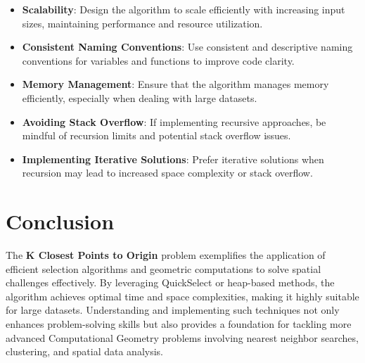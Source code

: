 \begin{itemize}
    \item \textbf{Scalability}: Design the algorithm to scale efficiently with increasing input sizes, maintaining performance and resource utilization.
    
    \item \textbf{Consistent Naming Conventions}: Use consistent and descriptive naming conventions for variables and functions to improve code clarity.
    
    \item \textbf{Memory Management}: Ensure that the algorithm manages memory efficiently, especially when dealing with large datasets.
    
    \item \textbf{Avoiding Stack Overflow}: If implementing recursive approaches, be mindful of recursion limits and potential stack overflow issues.
    
    \item \textbf{Implementing Iterative Solutions}: Prefer iterative solutions when recursion may lead to increased space complexity or stack overflow.
\end{itemize}

\section*{Conclusion}

The \textbf{K Closest Points to Origin} problem exemplifies the application of efficient selection algorithms and geometric computations to solve spatial challenges effectively. By leveraging QuickSelect or heap-based methods, the algorithm achieves optimal time and space complexities, making it highly suitable for large datasets. Understanding and implementing such techniques not only enhances problem-solving skills but also provides a foundation for tackling more advanced Computational Geometry problems involving nearest neighbor searches, clustering, and spatial data analysis.

\printindex

% 
% 
% 
% 